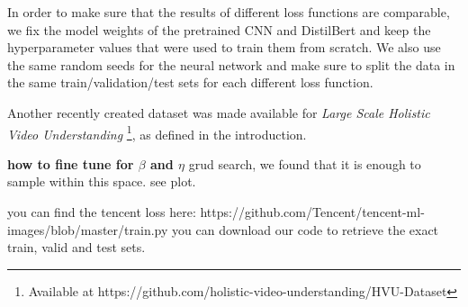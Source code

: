 In order to make sure that the results of different loss functions are comparable, we fix the model weights of the pretrained CNN and DistilBert and keep the hyperparameter values that were used to train them from scratch. We also use the same random seeds for the neural network and make sure to split the data in the same train/validation/test sets for each different loss function.


Another recently created dataset was made available for \emph{Large Scale Holistic Video Understanding} \cite{holisticVideoData} \footnote{Available at https://github.com/holistic-video-understanding/HVU-Dataset}, as defined in the introduction.

\textbf{how to fine tune for $\beta$ and $\eta$}
grud search, we found that it is enough to sample within this space. see plot.









you can find the tencent loss here: https://github.com/Tencent/tencent-ml-images/blob/master/train.py
you can download our code to retrieve the exact train, valid and test sets.


